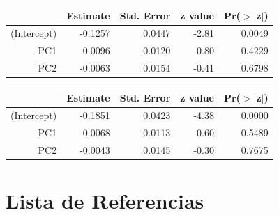 \documentclass[a4paper,12pt]{Latex/Classes/PhDthesisPSnPDF}
\begin{document}
\newpage
\begin{center}
\begin{table}[ht]
\centering
\begin{tabular}{rrrrr}
  \hline
 & Estimate & Std. Error & z value & Pr($>$$|$z$|$) \\ 
  \hline
(Intercept) & -0.1257 & 0.0447 & -2.81 & 0.0049 \\ 
  PC1 & 0.0096 & 0.0120 & 0.80 & 0.4229 \\ 
  PC2 & -0.0063 & 0.0154 & -0.41 & 0.6798 \\ 
   \hline
\end{tabular}
\end{table}\end{center}
\begin{center}
\begin{table}[ht]
\centering
\begin{tabular}{rrrrr}
  \hline
 & Estimate & Std. Error & z value & Pr($>$$|$z$|$) \\ 
  \hline
(Intercept) & -0.1851 & 0.0423 & -4.38 & 0.0000 \\ 
  PC1 & 0.0068 & 0.0113 & 0.60 & 0.5489 \\ 
  PC2 & -0.0043 & 0.0145 & -0.30 & 0.7675 \\ 
   \hline
\end{tabular}
\end{table}\end{center}


\chapter*{Lista de Referencias}
\end{document}
